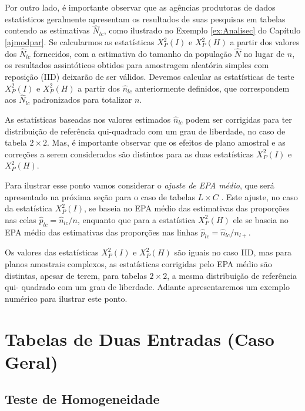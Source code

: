 \documentclass[]{book}
\numberwithin{example}{chapter}
\numberwithin{remark}{chapter}
\numberwithin{definition}{chapter}
\begin{document}
Por outro lado, é importante observar que as agências produtoras de
dados estatísticos geralmente apresentam os resultados de suas pesquisas
em tabelas contendo as estimativas \(\hat{N}_{lc}\), como ilustrado no
Exemplo \ref{ex:Analisec} do Capítulo \ref{ajmodpar}. Se calcularmos as
estatísticas \(X_{P}^{2}\left( I\right)\) e \(X_{P}^{2}\left( H\right)\)
a partir dos valores dos \(\hat{N}_{lc}\) fornecidos, com a estimativa
do tamanho da população \(\hat{N}\) no lugar de \(n\), os resultados
assintóticos obtidos para amostragem aleatória simples com reposição
(IID) deixarão de ser válidos. Devemos calcular as estatísticas de teste
\(X_{P}^{2}\left( I\right)\) e \(X_{P}^{2}\left( H\right)\) a partir dos
\(\hat{n}_{lc}\) anteriormente definidos, que correspondem aos
\(\hat{N}_{lc}\) padronizados para totalizar \(n\).

As estatísticas baseadas nos valores estimados \(\hat{n}_{lc}\) podem
ser corrigidas para ter distribuição de referência qui-quadrado com um
grau de liberdade, no caso de tabela \(2\times 2\). Mas, é importante
observar que os efeitos de plano amostral e as correções a serem
considerados são distintos para as duas estatísticas
\(X_{P}^{2}\left( I\right)\) e \(X_{P}^{2}\left(H\right)\).

Para ilustrar esse ponto vamos considerar o \emph{ajuste de EPA médio},
que será apresentado na próxima seção para o caso de tabelas
\(L\times C\) . Este ajuste, no caso da estatística
\(X_{P}^{2}\left( I\right)\), se baseia no EPA médio das estimativas das
proporções nas celas \(\hat{p}_{lc}=\hat{n}_{lc}/n\), enquanto que para
a estatística \(X_{P}^{2}\left( H\right)\) ele se baseia no EPA médio
das estimativas das proporções nas linhas
\(\hat{p}_{lc}=\hat{n} _{lc}/n_{l+}\).

Os valores das estatísticas \(X_{P}^{2}\left( I\right)\) e
\(X_{P}^{2}\left( H\right)\) são iguais no caso IID, mas para planos
amostrais complexos, as estatísticas corrigidas pelo EPA médio são
distintas, apesar de terem, para tabelas \(2\times 2\), a mesma
distribuição de referência qui- quadrado com um grau de liberdade.
Adiante apresentaremos um exemplo numérico para ilustrar este ponto.

\section{Tabelas de Duas Entradas (Caso
Geral)}\label{tabelas-de-duas-entradas-caso-geral}

\subsection{Teste de Homogeneidade}\label{teste-de-homogeneidade-1}
\end{document}
